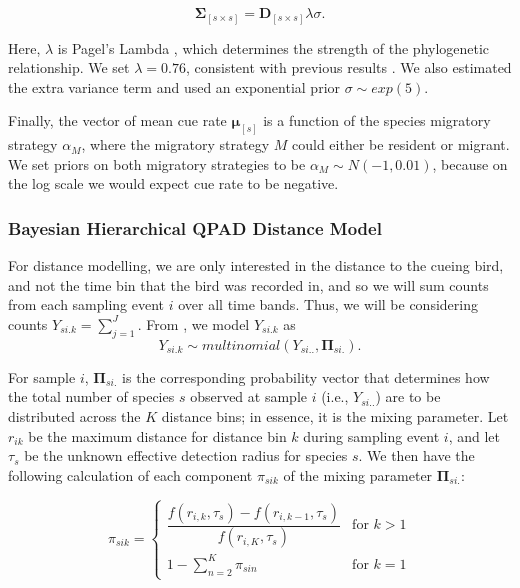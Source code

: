 \documentclass[12pt]{article}
\begin{document}
$$\mathbf{\Sigma}_{[s \times s]} = \mathbf{D}_{[s \times s]}\lambda\sigma.$$

\par Here, $\lambda$ is Pagel's Lambda \citep{pagel_inferring_1999}, which determines the strength of the phylogenetic relationship. 
We set $\lambda = 0.76$, consistent with previous results \cite{solymos_phylogeny_2018}. 
We also estimated the extra variance term and used an exponential prior $\sigma \sim exp(5)$.

\par Finally, the vector of mean cue rate $\mathbf{\mu}_{[s]}$ is a function of the species migratory strategy $\alpha_M$, where the migratory strategy $M$ could either be resident or migrant. 
We set priors on both migratory strategies to be $\alpha_M \sim N(-1, 0.01)$, because on the log scale we would expect cue rate to be negative. 

\subsubsection{Bayesian Hierarchical QPAD Distance Model}

\par For distance modelling, we are only interested in the distance to the cueing bird, and not the time bin that the bird was recorded in, and so we will sum counts from each sampling event $i$ over all time bands. 
Thus, we will be considering counts $Y_{si.k} = \sum_{j=1}^{J}$. 
From \citet{solymos_calibrating_2013}, we model $Y_{si.k}$ as
$$Y_{si.k} \sim multinomial\left(Y_{si..}, \mathbf{\Pi}_{si.}\right).$$

\par For sample $i$, $\mathbf{\Pi}_{si.}$ is the corresponding probability vector that determines how the total number of species $s$ observed at sample $i$ (i.e., $Y_{si..}$) are to be distributed across the $K$ distance bins; in essence, it is the mixing parameter. 
Let $r_{ik}$ be the maximum distance for distance bin $k$ during sampling event $i$, and let $\tau_s$ be the unknown effective detection radius for species $s$. 
We then have the following calculation of each component $\pi_{sik}$ of the mixing parameter $\mathbf{\Pi}_{si.}$:

\begin{equation*}
	\pi_{sik} = 
	\begin{cases}
		\dfrac{f(r_{i,k}, \tau_s) - f(r_{i,k-1}, \tau_s)}{f(r_{i,K}, \tau_s)} & \text{for } k > 1 \\
		1 - \sum_{n = 2}^{K} \pi_{sin} & \text{for } k = 1
	\end{cases}
\end{equation*}
\end{document}
